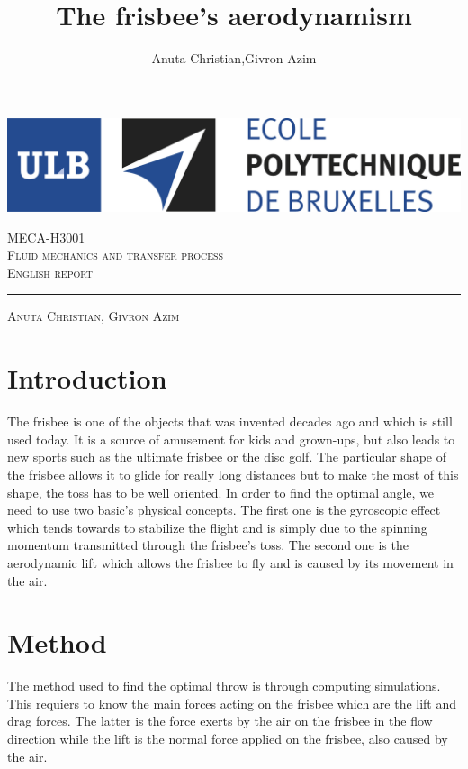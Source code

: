 \documentclass[10pt,a4paper]{report}
\author{Anuta Christian,Givron Azim}
\title{The frisbee's aerodynamism}
\begin{document}
\begin{titlepage}

\includegraphics[scale=0.5]{logo-polytech-ULB-FR.jpg}

\center 
\vspace{5cm}
\textsc{\large MECA-H3001} \\[0.5cm]
\textsc{\LARGE Fluid mechanics and transfer process} \\[1.5cm]
\textsc{\Large English report} %

\rule{\textwidth}{1pt}

\vspace{2cm}

\textsc{\large Anuta Christian, Givron Azim}

\end{titlepage}



\tableofcontents
\newpage 
\section{Introduction}
The frisbee is one of the objects that was invented decades ago and which is still used today. It is a source of amusement for kids and grown-ups, but also leads to new sports such as the ultimate frisbee or the disc golf. The particular shape of the frisbee allows it to glide for really long distances but to make the most of this shape, the toss has to be well oriented. In order to find the optimal angle, we need to use two basic’s physical concepts. The first one is the gyroscopic effect which tends towards to stabilize the flight and is simply due to the spinning momentum transmitted through the frisbee’s toss. The second one is the aerodynamic lift which allows the frisbee to fly and is caused by its movement in the air.

\section{Method}
The method used to find the optimal throw is through computing simulations. This requiers to know the main forces acting on the frisbee which are the lift and drag forces. The latter is the force exerts by the air on the frisbee in the flow direction while the lift is the normal force applied on the frisbee, also caused by the air.
\end{document}
